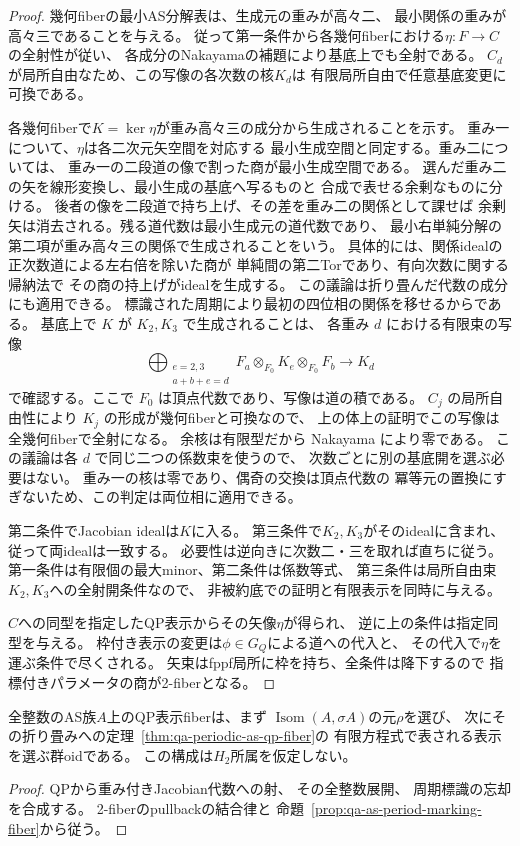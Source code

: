 \begin{proof}
幾何fiberの最小AS分解表は、生成元の重みが高々二、
最小関係の重みが高々三であることを与える。
従って第一条件から各幾何fiberにおける$\eta:F\to C$の全射性が従い、
各成分のNakayamaの補題により基底上でも全射である。
$C_d$が局所自由なため、この写像の各次数の核$K_d$は
有限局所自由で任意基底変更に可換である。

各幾何fiberで$K=\ker\eta$が重み高々三の成分から生成されることを示す。
重み一について、$\eta$は各二次元矢空間を対応する
最小生成空間と同定する。重み二については、
重み一の二段道の像で割った商が最小生成空間である。
選んだ重み二の矢を線形変換し、最小生成の基底へ写るものと
合成で表せる余剰なものに分ける。
後者の像を二段道で持ち上げ、その差を重み二の関係として課せば
余剰矢は消去される。残る道代数は最小生成元の道代数であり、
最小右単純分解の第二項が重み高々三の関係で生成されることをいう。
具体的には、関係idealの正次数道による左右倍を除いた商が
単純間の第二Torであり、有向次数に関する帰納法で
その商の持上げがidealを生成する。
この議論は折り畳んだ代数の成分にも適用できる。
標識された周期により最初の四位相の関係を移せるからである。
基底上で $K$ が $K_2,K_3$ で生成されることは、
各重み $d$ における有限束の写像
\[
 \bigoplus_{\substack{e=2,3\\ a+b+e=d}}
 F_a\otimes_{F_0} K_e\otimes_{F_0} F_b
 \longrightarrow K_d
\]
で確認する。ここで $F_0$ は頂点代数であり、写像は道の積である。
$C_j$ の局所自由性により $K_j$ の形成が幾何fiberと可換なので、
上の体上の証明でこの写像は全幾何fiberで全射になる。
余核は有限型だから Nakayama により零である。
この議論は各 $d$ で同じ二つの係数束を使うので、
次数ごとに別の基底開を選ぶ必要はない。
重み一の核は零であり、偶奇の交換は頂点代数の
冪等元の置換にすぎないため、この判定は両位相に適用できる。

第二条件でJacobian idealは$K$に入る。
第三条件で$K_2,K_3$がそのidealに含まれ、従って両idealは一致する。
必要性は逆向きに次数二・三を取れば直ちに従う。
第一条件は有限個の最大minor、第二条件は係数等式、
第三条件は局所自由束$K_2,K_3$への全射開条件なので、
非被約底での証明と有限表示を同時に与える。

$C$への同型を指定したQP表示からその矢像$\eta$が得られ、
逆に上の条件は指定同型を与える。
枠付き表示の変更は$\phi\in G_Q$による道への代入と、
その代入で$\eta$を運ぶ条件で尽くされる。
矢束はfppf局所に枠を持ち、全条件は降下するので
指標付きパラメータの商が2-fiberとなる。
\end{proof}

\begin{corollary}[周期を忘れたAS族へのQP表示]
\label{cor:qa-unmarked-as-qp-fiber}
全整数のAS族$A$上のQP表示fiberは、まず
$\operatorname{Isom}(A,\sigma A)$の元$\rho$を選び、
次にその折り畳みへの定理~\ref{thm:qa-periodic-as-qp-fiber}の
有限方程式で表される表示を選ぶ群oidである。
この構成は$H_2$所属を仮定しない。
\end{corollary}
\begin{proof}
QPから重み付きJacobian代数への射、
その全整数展開、
周期標識の忘却を合成する。
2-fiberのpullbackの結合律と
命題~\ref{prop:qa-as-period-marking-fiber}から従う。
\end{proof}

